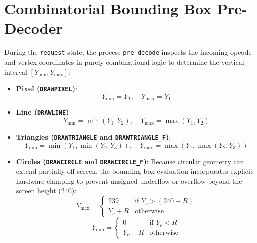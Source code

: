\section{Combinatorial Bounding Box Pre-Decoder}
During the \texttt{request} state, the process \texttt{pre\_decode} inspects the incoming opcode and vertex coordinates in purely combinational logic to determine the vertical interval $[Y_{\min}, Y_{\max}]$:
\begin{itemize}
    \item \textbf{Pixel (\texttt{DRAWPIXEL})}:
    \begin{equation}
    Y_{\min} = Y_1, \quad Y_{\max} = Y_1
    \end{equation}
    \item \textbf{Line (\texttt{DRAWLINE})}:
    \begin{equation}
    Y_{\min} = \min(Y_1, Y_2), \quad Y_{\max} = \max(Y_1, Y_2)
    \end{equation}
    \item \textbf{Triangles (\texttt{DRAWTRIANGLE} and \texttt{DRAWTRIANGLE\_F})}:
    \begin{equation}
    Y_{\min} = \min(Y_1, \min(Y_2, Y_3)), \quad Y_{\max} = \max(Y_1, \max(Y_2, Y_3))
    \end{equation}
    \item \textbf{Circles (\texttt{DRAWCIRCLE} and \texttt{DRAWCIRCLE\_F})}:
    Because circular geometry can extend partially off-screen, the bounding box evaluation incorporates explicit hardware clamping to prevent unsigned underflow or overflow beyond the screen height ($240$):
    \begin{equation}
    Y_{\max} = \begin{cases} 
    239 & \text{if } Y_c > (240 - R) \\ 
    Y_c + R & \text{otherwise} 
    \end{cases}
    \end{equation}
    \begin{equation}
    Y_{\min} = \begin{cases} 
    0 & \text{if } Y_c < R \\ 
    Y_c - R & \text{otherwise} 
    \end{cases}
    \end{equation}
\end{itemize}

